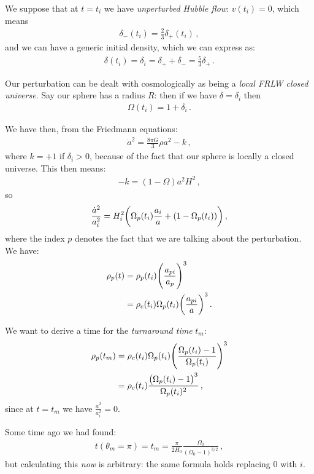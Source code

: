 \documentclass[main.tex]{subfiles}
\begin{document}
We suppose that at \(t=t_i\) we have \emph{unperturbed Hubble flow}: \(v(t_i) = 0\), which means 
%
\begin{align}
\delta_{-} (t_i) = \frac{2}{3} \delta_{+}(t_i)
\,,
\end{align}
%
and we can have a generic initial density, which we can express as: 
%
\begin{align}
\delta (t_i) = \delta_{i} = \delta_{+} + \delta_{-} = \frac{5}{3} \delta_{+} 
\,.
\end{align}

Our perturbation can be dealt with cosmologically as being a \emph{local FRLW closed universe}. 
Say our sphere has a radius \(R\): then if we have \( \delta = \delta_i\) then 
%
\begin{align}
\Omega (t_i) = 1 + \delta_{i}
\,.
\end{align}

We have then, from the Friedmann equations: 
%
\begin{align}
\dot{a}^2 = \frac{8 \pi G}{3} \rho a^2 - k 
\,,
\end{align}
%
where \(k = +1\) if \(\delta_{i} > 0\), because of the fact that our sphere is locally a closed universe. 
This then means: 
%
\begin{align}
- k = (1 - \Omega ) a^2 H^2
\,,
\end{align}
%
so 
%
\begin{align}
\frac{\dot{a}^2 }{a_i^2} = H_i^2 \qty(
    \Omega_{p} (t_i) \frac{a_i}{a} + (1 - \Omega_{p}(t_i))
)
\,,
\end{align}
%
where the index \(p\) denotes the fact that we are talking about the perturbation. We have: 
%
\begin{align}
\rho_{p} (t) &= \rho_{p}(t_i) \qty(\frac{a_{pi}}{a_p})^3  \\
&= \rho_{c} (t_i) \Omega_{p} (t_i) \qty(\frac{a_{pi}}{a})^3
\,.
\end{align}

We want to derive a time for the \emph{turnaround time} \(t_m\): 
%
\begin{align}
\rho_{p} (t_m) &= \rho_{c} (t_i) \Omega_{p}(t_i) \qty(\frac{\Omega_{p}(t_i) - 1}{\Omega_{p} (t_i)})^3  \\
&= \rho_{c}(t_i) \frac{\qty(\Omega_{p}(t_i) - 1)^3}{\Omega_{p}(t_i)^2}
\,,
\end{align}
%
since at \(t = t_m\) we have \(\frac{\dot{a}^2}{a_{i}^2} = 0\). 

Some time ago we had found: 
%
\begin{align}
t (\theta_{m} = \pi ) = t_m = \frac{\pi }{2 H_0 } \frac{\Omega_0 }{(\Omega_0 - 1)^{3/2}}
\,,
\end{align}
%
but calculating this \emph{now} is arbitrary: the same formula holds replacing \(0\) with \(i\). 
\end{document}
